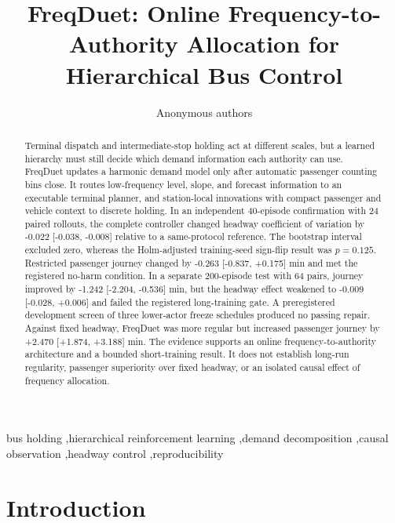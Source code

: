 \documentclass[preprint,12pt,authoryear,nopreprintline]{elsarticle}
\begin{document}
\begin{frontmatter}

\title{FreqDuet: Online Frequency-to-Authority Allocation for
Hierarchical Bus Control}
\author{Anonymous authors}
\address{Affiliations withheld in the anonymous working manuscript}

\begin{abstract}
Terminal dispatch and intermediate-stop holding act at different scales,
but a learned hierarchy must still decide which demand information each
authority can use. FreqDuet updates a harmonic demand model only after
automatic passenger counting bins close. It routes low-frequency level,
slope, and forecast information to an executable terminal planner, and
station-local innovations with compact passenger and vehicle context to
discrete holding. In an independent 40-episode confirmation with 24
paired rollouts, the complete controller changed headway coefficient of
variation by -0.022 {[}-0.038, -0.008{]} relative to a same-protocol
reference. The bootstrap interval excluded zero, whereas the
Holm-adjusted training-seed sign-flip result was \(p=0.125\). Restricted
passenger journey changed by -0.263 {[}-0.837, +0.175{]} min and met the
registered no-harm condition. In a separate 200-episode test with 64
pairs, journey improved by -1.242 {[}-2.204, -0.536{]} min, but the
headway effect weakened to -0.009 {[}-0.028, +0.006{]} and failed the
registered long-training gate. A preregistered development screen of
three lower-actor freeze schedules produced no passing repair. Against
fixed headway, FreqDuet was more regular but increased passenger journey
by +2.470 {[}+1.874, +3.188{]} min. The evidence supports an online
frequency-to-authority architecture and a bounded short-training result.
It does not establish long-run regularity, passenger superiority over
fixed headway, or an isolated causal effect of frequency allocation.
\end{abstract}

\begin{keyword}
bus holding \sep hierarchical reinforcement learning \sep demand
decomposition \sep causal observation \sep headway
control \sep reproducibility
\end{keyword}

\end{frontmatter}

\section{Introduction}\label{introduction}
\end{document}
